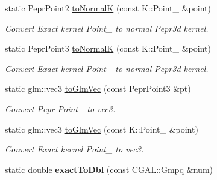 \begin{DoxyCompactItemize}
\mbox{\label{classpepr3d_1_1_triangle_detail_ac85fa082aaa6c3f8cddca396516857d5}} 
static Pepr\+Point2 \mbox{\hyperlink{classpepr3d_1_1_triangle_detail_ac85fa082aaa6c3f8cddca396516857d5}{to\+NormalK}} (const K\+::\+Point\+\_ \&point)
\begin{DoxyCompactList}\small\item\em Convert Exact kernel Point\+\_ to normal Pepr3d kernel. \end{DoxyCompactList}\item 
\mbox{\label{classpepr3d_1_1_triangle_detail_a49ed4eb7b270a5173db8257e822cac14}} 
static Pepr\+Point3 \mbox{\hyperlink{classpepr3d_1_1_triangle_detail_a49ed4eb7b270a5173db8257e822cac14}{to\+NormalK}} (const K\+::\+Point\+\_ \&point)
\begin{DoxyCompactList}\small\item\em Convert Exact kernel Point\+\_ to normal Pepr3d kernel. \end{DoxyCompactList}\item 
\mbox{\label{classpepr3d_1_1_triangle_detail_a013e7b3a720d433ce10ea3eed3438fc4}} 
static glm\+::vec3 \mbox{\hyperlink{classpepr3d_1_1_triangle_detail_a013e7b3a720d433ce10ea3eed3438fc4}{to\+Glm\+Vec}} (const Pepr\+Point3 \&pt)
\begin{DoxyCompactList}\small\item\em Convert Pepr Point\+\_ to vec3. \end{DoxyCompactList}\item 
\mbox{\label{classpepr3d_1_1_triangle_detail_a19a7cded9a34b708ac7e909d47c3b0a6}} 
static glm\+::vec3 \mbox{\hyperlink{classpepr3d_1_1_triangle_detail_a19a7cded9a34b708ac7e909d47c3b0a6}{to\+Glm\+Vec}} (const K\+::\+Point\+\_ \&point)
\begin{DoxyCompactList}\small\item\em Convert Exact kernel Point\+\_ to vec3. \end{DoxyCompactList}\item 
\mbox{\label{classpepr3d_1_1_triangle_detail_a3a270f31457d95be3039509a36f1559c}} 
static double {\bfseries exact\+To\+Dbl} (const C\+G\+A\+L\+::\+Gmpq \&num)
\item 

\end{DoxyCompactItemize}
